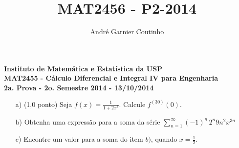 \documentclass[12pt,a4paper]{article}
\title{MAT2456 - P2-2014}
\author{André Garnier Coutinho}
\begin{document}
\begin{center}
\textbf{Instituto de Matemática e Estatística da USP\\
MAT2455 - Cálculo Diferencial e Integral IV para Engenharia\\}
\textbf{2a. Prova - 2o. Semestre 2014 - 13/10/2014}
\end{center}


\begin{itemize}
	\item[a)] (1,0 ponto) Seja $ f(x) = \displaystyle\frac{1}{1+2x^3}$. Calcule $f^{(30)}(0)$.
	
	\item[b)] Obtenha uma expressão para a soma da série $\displaystyle\sum_{n=1}^\infty (-1)^n \, 2^n 9 n^2 x^{3n}$ 
	\item[c)] Encontre um valor para a soma do item $b)$, quando $x = \displaystyle\frac{1}{2}$.
\end{itemize}
\end{document}
